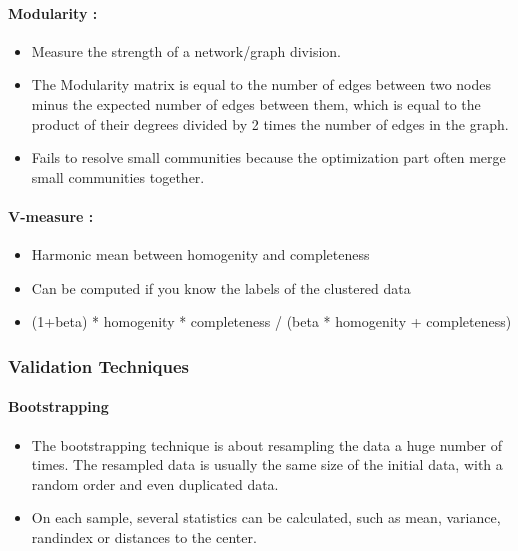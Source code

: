 \documentclass[11pt]{article}
\providecommand{\tightlist}{%
      \setlength{\itemsep}{0pt}\setlength{\parskip}{0pt}}
\begin{document}
    \hypertarget{modularity}{%
\paragraph{Modularity :}\label{modularity}}

    \begin{itemize}
\tightlist
\item
  Measure the strength of a network/graph division.
\item
  The Modularity matrix is equal to the number of edges between two
  nodes minus the expected number of edges between them, which is equal
  to the product of their degrees divided by 2 times the number of edges
  in the graph.
\item
  Fails to resolve small communities because the optimization part often
  merge small communities together.
\end{itemize}

    \hypertarget{v-measure}{%
\paragraph{V-measure :}\label{v-measure}}

    \begin{itemize}
\tightlist
\item
  Harmonic mean between homogenity and completeness
\item
  Can be computed if you know the labels of the clustered data
\item
  (1+beta) * homogenity * completeness / (beta * homogenity +
  completeness)
\end{itemize}

    \hypertarget{validation-techniques}{%
\subsubsection{Validation Techniques}\label{validation-techniques}}

    \hypertarget{bootstrapping}{%
\paragraph{Bootstrapping}\label{bootstrapping}}

    \begin{itemize}
\tightlist
\item
  The bootstrapping technique is about resampling the data a huge number
  of times. The resampled data is usually the same size of the initial
  data, with a random order and even duplicated data.
\item
  On each sample, several statistics can be calculated, such as mean,
  variance, randindex or distances to the center.
\end{itemize}
\end{document}
